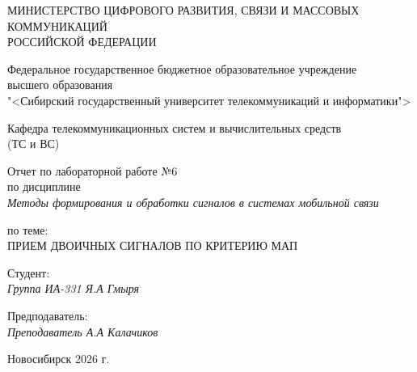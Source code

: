 \thispagestyle{empty}

\begin{center}
    МИНИСТЕРСТВО ЦИФРОВОГО РАЗВИТИЯ, СВЯЗИ И МАССОВЫХ КОММУНИКАЦИЙ \\ РОССИЙСКОЙ ФЕДЕРАЦИИ

    \vspace{20pt}

    Федеральное государственное бюджетное образовательное учреждение  \\  высшего образования \\
    "<Сибирский государственный университет телекоммуникаций и информатики"> \\

    \vspace{20pt}

    Кафедра телекоммуникационных систем и вычислительных средств \\  (ТС и ВС)
\end{center}

\vfill

\begin{center}
    Отчет по лабораторной работе №6 \\  
    по дисциплине \\
    \textit{Методы формирования и обработки сигналов в системах мобильной связи}

    \vspace{20pt}

    по теме: \\
    \uppercase{Прием двоичных сигналов по критерию МАП}
\end{center}

\vfill

    \noindent Студент: \\
    \textit{Группа ИА-331 \hfill Я.А Гмыря}

    \vspace{20pt}

    \noindent Предподаватель: \\
    \textit{Преподаватель \hfill А.А Калачиков}

\vfill

\begin{center}
    Новосибирск 2026 г.
\end{center}